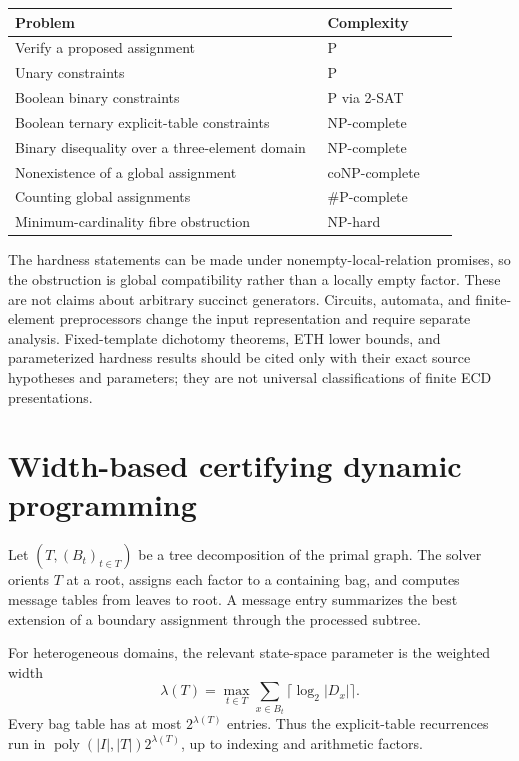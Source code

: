 \documentclass[11pt]{article}
\theoremstyle{plain}
\theoremstyle{definition}
\theoremstyle{remark}
\begin{document}
\begin{center}
\begin{tabular}{@{}p{0.62\linewidth}p{0.26\linewidth}@{}}
\toprule
Problem & Complexity\\
\midrule
Verify a proposed assignment & P\\
Unary constraints & P\\
Boolean binary constraints & P via 2-SAT\\
Boolean ternary explicit-table constraints & NP-complete\\
Binary disequality over a three-element domain & NP-complete\\
Nonexistence of a global assignment & coNP-complete\\
Counting global assignments & \(\#\mathrm P\)-complete\\
Minimum-cardinality fibre obstruction & NP-hard\\
\bottomrule
\end{tabular}
\end{center}

The hardness statements can be made under nonempty-local-relation promises, so
the obstruction is global compatibility rather than a locally empty factor.
These are not claims about arbitrary succinct generators.  Circuits, automata,
and finite-element preprocessors change the input representation and require
separate analysis.  Fixed-template dichotomy theorems, ETH lower bounds, and
parameterized hardness results should be cited only with their exact source
hypotheses and parameters; they are not universal classifications of finite ECD
presentations.

\section{Width-based certifying dynamic programming}
\label{sec:width-dp}

Let \((T,(B_t)_{t\in T})\) be a tree decomposition of the primal graph.  The
solver orients \(T\) at a root, assigns each factor to a containing bag, and
computes message tables from leaves to root.  A message entry summarizes the
best extension of a boundary assignment through the processed subtree.

For heterogeneous domains, the relevant state-space parameter is the weighted
width
\[
  \lambda(T)=\max_{t\in T}\sum_{x\in B_t}\lceil\log_2|D_x|\rceil.
\]
Every bag table has at most \(2^{\lambda(T)}\) entries.  Thus the explicit-table
recurrences run in \(\operatorname{poly}(|I|,|T|)2^{\lambda(T)}\), up to
indexing and arithmetic factors.
\end{document}
